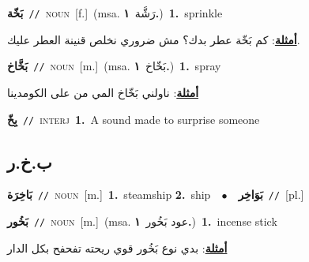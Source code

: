 \documentclass[10pt,a4paper,twoside]{article} %
\begin{document}
\begin{multicols}{2}
{\setlength\topsep{0pt}\textbf{\foreignlanguage{arabic}{بَخّة}}\ {\color{gray}\texttt{//}\color{black}}\ \textsc{noun}\ [f.]\ \color{gray}(msa. \foreignlanguage{arabic}{رَشَّة}~\foreignlanguage{arabic}{\textbf{١.}})\color{black}\ \textbf{1.}~sprinkle\  \begin{flushright}\color{gray}\foreignlanguage{arabic}{\textbf{\underline{\foreignlanguage{arabic}{أمثلة}}}: كم بَخّة عطر بدك؟ مش ضروري نخلص قنينة العطر عليك.}\end{flushright}\color{black}} \vspace{2mm}

{\setlength\topsep{0pt}\textbf{\foreignlanguage{arabic}{بَخَّاخ}}\ {\color{gray}\texttt{//}\color{black}}\ \textsc{noun}\ [m.]\ \color{gray}(msa. \foreignlanguage{arabic}{بَخّاخ}~\foreignlanguage{arabic}{\textbf{١.}})\color{black}\ \textbf{1.}~spray\  \begin{flushright}\color{gray}\foreignlanguage{arabic}{\textbf{\underline{\foreignlanguage{arabic}{أمثلة}}}: ناولني بَخّاخ المي من على الكومدينا}\end{flushright}\color{black}} \vspace{2mm}

{\setlength\topsep{0pt}\textbf{\foreignlanguage{arabic}{بِخّ}}\ {\color{gray}\texttt{//}\color{black}}\ \textsc{interj}\ \textbf{1.}~A sound made to surprise someone\ } \vspace{2mm}

\vspace{-3mm}
\subsection*{\color{blue}\foreignlanguage{arabic}{ب.خ.ر}\color{blue}{}} 

{\setlength\topsep{0pt}\textbf{\foreignlanguage{arabic}{بَاخِرَة}}\ {\color{gray}\texttt{//}\color{black}}\ \textsc{noun}\ [m.]\ \textbf{1.}~steamship  \textbf{2.}~ship\ \ $\bullet$\ \ \setlength\topsep{0pt}\textbf{\foreignlanguage{arabic}{بَوَاخِر}}\ {\color{gray}\texttt{//}\color{black}}\ [pl.]\ } \vspace{2mm}

{\setlength\topsep{0pt}\textbf{\foreignlanguage{arabic}{بَخُور}}\ {\color{gray}\texttt{//}\color{black}}\ \textsc{noun}\ [m.]\ \color{gray}(msa. \foreignlanguage{arabic}{عود بَخُور}~\foreignlanguage{arabic}{\textbf{١.}})\color{black}\ \textbf{1.}~incense stick\  \begin{flushright}\color{gray}\foreignlanguage{arabic}{\textbf{\underline{\foreignlanguage{arabic}{أمثلة}}}: بدي نوع بَخُور قوي ريحته تفحفح بكل الدار}\end{flushright}\color{black}} \vspace{2mm}


\end{multicols}
\end{document}
